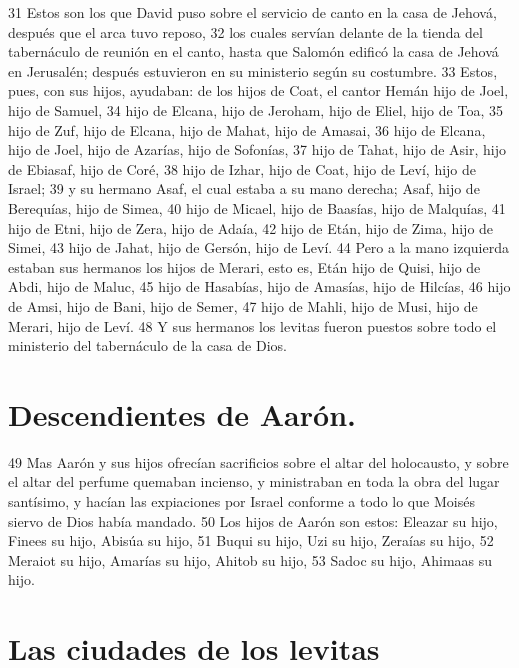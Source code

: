 31 Estos son los que David puso sobre el servicio de canto en la casa de Jehová, después que el arca tuvo reposo,
32 los cuales servían delante de la tienda del tabernáculo de reunión en el canto, hasta que Salomón edificó la casa de Jehová en Jerusalén; después estuvieron en su ministerio según su costumbre.
33 Estos, pues, con sus hijos, ayudaban: de los hijos de Coat, el cantor Hemán hijo de Joel, hijo de Samuel,
34 hijo de Elcana, hijo de Jeroham, hijo de Eliel, hijo de Toa, 
35 hijo de Zuf, hijo de Elcana, hijo de Mahat, hijo de Amasai,
36 hijo de Elcana, hijo de Joel, hijo de Azarías, hijo de Sofonías,
37 hijo de Tahat, hijo de Asir, hijo de Ebiasaf, hijo de Coré,
38 hijo de Izhar, hijo de Coat, hijo de Leví, hijo de Israel;
39 y su hermano Asaf, el cual estaba a su mano derecha; Asaf, hijo de Berequías, hijo de Simea,
40 hijo de Micael, hijo de Baasías, hijo de Malquías,
41 hijo de Etni, hijo de Zera, hijo de Adaía,
42 hijo de Etán, hijo de Zima, hijo de Simei,
43 hijo de Jahat, hijo de Gersón, hijo de Leví.
44 Pero a la mano izquierda estaban sus hermanos los hijos de Merari, esto es, Etán hijo de Quisi, hijo de Abdi, hijo de Maluc,
45 hijo de Hasabías, hijo de Amasías, hijo de Hilcías,
46 hijo de Amsi, hijo de Bani, hijo de Semer,
47 hijo de Mahli, hijo de Musi, hijo de Merari, hijo de Leví.
48 Y sus hermanos los levitas fueron puestos sobre todo el ministerio del tabernáculo de la casa de Dios.
\section*{Descendientes de Aarón.}

49 Mas Aarón y sus hijos ofrecían sacrificios sobre el altar del holocausto, y sobre el altar del perfume quemaban incienso, y ministraban en toda la obra del lugar santísimo, y hacían las expiaciones por Israel conforme a todo lo que Moisés siervo de Dios había mandado.
50 Los hijos de Aarón son estos: Eleazar su hijo, Finees su hijo, Abisúa su hijo,
51 Buqui su hijo, Uzi su hijo, Zeraías su hijo,
52 Meraiot su hijo, Amarías su hijo, Ahitob su hijo,
53 Sadoc su hijo, Ahimaas su hijo.
\section*{Las ciudades de los levitas}

